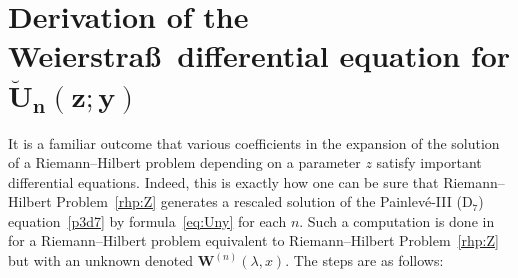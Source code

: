 \section[Derivation of the Weierstrass differential equation for breve{U}\_\{n\}(z;y)]{Derivation of the Weierstra\ss\ differential equation for $\boldsymbol{\breve{U}_n(z;y)}$}
It is a familiar outcome that various coefficients in the expansion of the solution of a Riemann--Hilbert problem depending on a parameter $z$ satisfy important differential equations. Indeed, this is exactly how one can be sure that Riemann--Hilbert Problem~\ref{rhp:Z} generates a rescaled solution of the Painlev\'e-III (D$_7$) equation~\eqref{p3d7} by formula~\eqref{eq:Uny} for each $n$. Such a computation is done in~\cite[Section 3.2]{BuckinghamM22} for a Riemann--Hilbert problem equivalent to Riemann--Hilbert Problem~\ref{rhp:Z} but with an unknown denoted $\mathbf{W}^{(n)}(\lambda,x)$. The steps are as follows:
